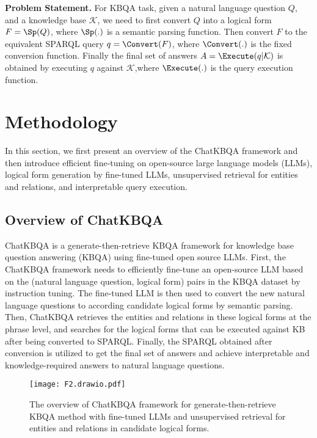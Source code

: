 \documentclass{article} \usepackage{iclr2024_conference,times}
\begin{document}
\textbf{Problem Statement. }For KBQA task, given a natural language question $Q$, and a knowledge base $\mathcal{K}$, we need to first convert $Q$ into a logical form $F=\Sp(Q)$, where $\Sp(.)$ is a semantic parsing function. Then convert $F$ to the equivalent SPARQL query $q=\Convert(F)$, where $\Convert(.)$ is the fixed conversion function. Finally the final set of answers $A=\Execute(q|\mathcal{K})$ is obtained by executing $q$ against $\mathcal{K}$,where $\Execute(.)$ is the query execution function.









\section{Methodology}

In this section, we first present an overview of the ChatKBQA framework and then introduce efficient fine-tuning on open-source large language models (LLMs), logical form generation by fine-tuned LLMs, unsupervised retrieval for entities and relations, and interpretable query execution.

\subsection{Overview of ChatKBQA}

ChatKBQA is a generate-then-retrieve KBQA framework for knowledge base question answering (KBQA) using fine-tuned open source LLMs. First, the ChatKBQA framework needs to efficiently fine-tune an open-source LLM based on the (natural language question, logical form) pairs in the KBQA dataset by instruction tuning. The fine-tuned LLM is then used to convert the new natural language questions to according candidate logical forms by semantic parsing. Then, ChatKBQA retrieves the entities and relations in these logical forms at the phrase level, and searches for the logical forms that can be executed against KB after being converted to SPARQL. Finally, the SPARQL obtained after conversion is utilized to get the final set of answers and achieve interpretable and knowledge-required answers to natural language questions.


\begin{figure*}[h!t]
\centering
\texttt{[image: F2.drawio.pdf]}
\caption{The overview of ChatKBQA framework for generate-then-retrieve KBQA method with fine-tuned LLMs and unsupervised retrieval for entities and relations in candidate logical forms.}
\label{f2}
\end{figure*}
\end{document}
